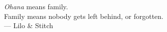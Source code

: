 \thispagestyle{empty}
{}

\vspace*{3cm}

\begin{center}
    \emph{Ohana} means family. \\
    Family means nobody gets left behind, or forgotten. \\ \medskip
    --- Lilo \& Stitch    
\end{center}

\medskip